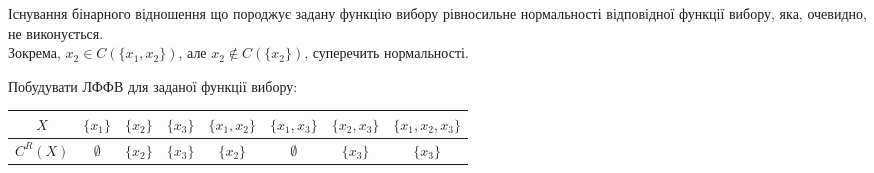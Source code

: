 \begin{solution}
    
    Існування бінарного відношення що породжує задану функцію вибору рівносильне нормальності відповідної функції вибору, яка, очевидно, не виконується. \\
        
    Зокрема, $x_2 \in C(\{x_1, x_2\})$, але $x_2 \notin C(\{x_2\})$, суперечить нормальності.
\end{solution}

\newpage

\begin{problem}
    Побудувати ЛФФВ для заданої функції вибору: 
    
    \begin{table}[H]
        \centering
        \begin{tabular}{|c|c|c|c|c|c|c|c|}
            \hline
            $X$ & $\{x_1\}$ & $\{x_2\}$ & $\{x_3\}$ & $\{x_1, x_2\}$ & $\{x_1, x_3\}$ & $\{x_2, x_3\}$ & $\{x_1, x_2, x_3\}$ \\ \hline
            $C^R(X)$ & $\emptyset$ & $\{x_2\}$ & $\{x_3\}$ & $\{x_2\}$ & $\emptyset$ & $\{x_3\}$ & $\{x_3\}$ \\ \hline
        \end{tabular}
    \end{table}
\end{problem}

